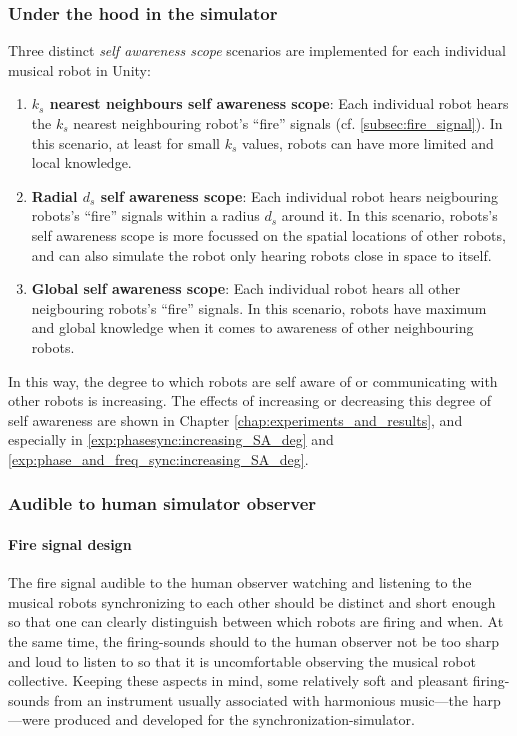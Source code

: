 	

		\subsubsection{Under the hood in the simulator}
		\label{SA_scopes_implemented}
		
		Three distinct \textit{self awareness scope} scenarios are implemented for each individual musical robot in Unity:
		
		\begin{enumerate}
			\item \textbf{$k_s$ nearest neighbours self awareness scope}: Each individual robot hears the $k_s$ nearest neighbouring robot's ``fire'' signals (cf. \ref{subsec:fire_signal}). In this scenario, at least for small $k_s$ values, robots can have more limited and local knowledge.
			\item \textbf{Radial $d_s$ self awareness scope}: Each individual robot hears neigbouring robots's ``fire'' signals within a radius $d_s$ around it. In this scenario, robots's self awareness scope is more focussed on the spatial locations of other robots, and can also simulate the robot only hearing robots close in space to itself.
			\item \textbf{Global self awareness scope}: Each individual robot hears all other neigbouring robots's ``fire'' signals. In this scenario, robots have maximum and global knowledge when it comes to awareness of other neighbouring robots.
		\end{enumerate}
		
		In this way, the degree to which robots are self aware of or communicating with other robots is increasing. The effects of increasing or decreasing this degree of self awareness are shown in Chapter \ref{chap:experiments_and_results}, and especially in \ref{exp:phasesync:increasing_SA_deg} and \ref{exp:phase_and_freq_sync:increasing_SA_deg}.
		

		\subsubsection{Audible to human simulator observer}
		\label{human_audible_fire_signals}

			\paragraph{Fire signal design}
			The fire signal audible to the human observer watching and listening to the musical robots synchronizing to each other should be distinct and short enough so that one can clearly distinguish between which robots are firing and when. At the same time, the firing-sounds should to the human observer not be too sharp and loud to listen to so that it is uncomfortable observing the musical robot collective. Keeping these aspects in mind, some relatively soft and pleasant firing-sounds from an instrument usually associated with harmonious music—the harp—were produced and developed for the synchronization-simulator.
			
